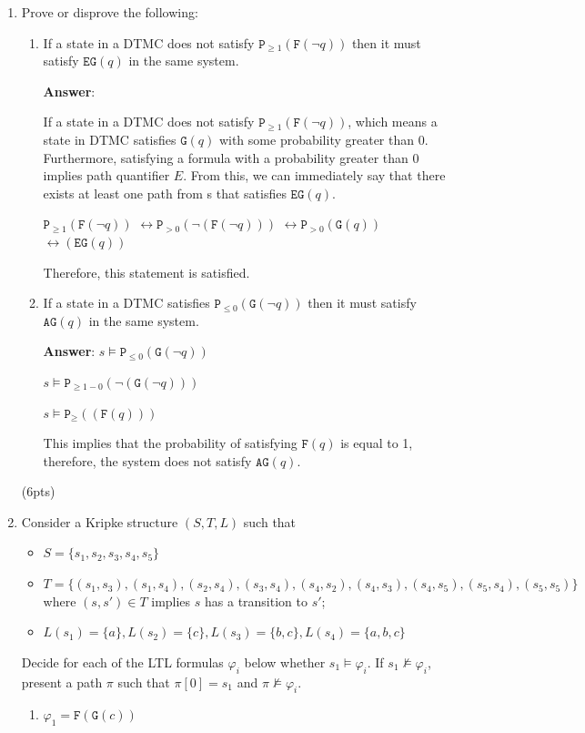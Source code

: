 \documentclass[11pt]{article}
\newcommand{\ag}[1]{\texttt{AG}(#1)}
\newcommand{\eg}[1]{\texttt{EG}(#1)}
\newcommand{\lf}[1]{\texttt{F}(#1)}
\newcommand{\llg}[1]{\texttt{G}(#1)}
\begin{document}
\begin{enumerate}
\item 
Prove or disprove the following:
\begin{enumerate}
\item 
If a state in a DTMC does not satisfy $\mathtt{P}_{\geq 1}(\lf{\neg q})$ then 
it must satisfy $\eg{q}$ in the same system.

\textbf{Answer}: 

If a state in a DTMC does not satisfy $\mathtt{P}_{\geq 1}(\lf{\neg q})$, which means a state in DTMC satisfies $\llg{q}$ with some probability greater than 0. Furthermore, satisfying a formula with a probability greater than 0 implies path quantifier $E$. From this, we can immediately say that there exists at least one path from s that satisfies $\eg{q}$.  

$\mathtt{P}_{\geq 1}(\lf{\neg q})$ 
$\leftrightarrow \mathtt{P}_{>0}(\neg (\lf{\neg q}))$
$\leftrightarrow \mathtt{P}_{>0}(\llg{ q})$
$\leftrightarrow (\eg{q})$

Therefore, this statement is satisfied.

\item 
If a state in a DTMC satisfies $\mathtt{P}_{\leq 0}(\llg{\neg q})$ then it must satisfy $\ag{q}$ in the same system.

\textbf{Answer}: 
$s \models \mathtt{P}_{\leq 0}(\llg{\neg q})$

$s \models \mathtt{P}_{\geq 1-0}(\neg (\llg{\neg q}))$

$s \models \mathtt{P}_{\geq}((\lf{ q}))$

This implies that the probability of satisfying $\lf{ q}$ is equal to 1, therefore, the system does not satisfy $\ag{q}$. 

\end{enumerate}
\hfill(6pts)

\item 
Consider a Kripke structure $(S, T, L)$ such that
\begin{itemize}
\item  $S = \{s_1, s_2, s_3, s_4, s_5\}$
\item $T = \{(s_1, s_3), (s_1, s_4), (s_2, s_4), (s_3, s_4), (s_4, s_2), (s_4, s_3), (s_4, s_5), (s_5, s_4), (s_5, s_5)\}$
 where $(s, s') \in T$
implies $s$ has a transition to $s'$;
\item $L(s_1) = \{a\}, L(s_2) = \{c\}, L(s_3) = \{b, c\}, L(s_4) = \{a, b, c\}$
\end{itemize}
Decide for each of the LTL formulas $\varphi_i$ below whether $s_1 \models \varphi_i$. If $s_1 \not\models \varphi_i$, 
present a path $\pi$ such that $\pi[0] = s_1$ and $\pi \not\models \varphi_i$.
\begin{enumerate}
\item $\varphi_1 = \lf{\llg{c}}$


\end{enumerate}
\end{enumerate}
\end{document}
